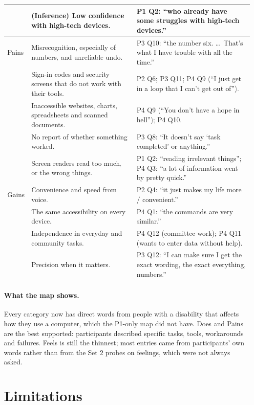 \documentclass[12pt, titlepage]{article}
\begin{document}
{\begin{longtable}{>{\raggedright\arraybackslash}p{1.8cm} >{\raggedright\arraybackslash}p{5.7cm} >{\raggedright\arraybackslash}p{7.6cm}}
 & \textbf{(Inference)} Low confidence with high-tech devices. & P1 Q2: ``who already have some struggles with high-tech devices.''\\
\midrule
Pains & Misrecognition, especially of numbers, and unreliable undo. & P3 Q10: ``the number six. \ldots\ That's what I have trouble with all the time.''\\\addlinespace[3pt]
 & Sign-in codes and security screens that do not work with their tools. & P2 Q6; P3 Q11; P4 Q9 (``I just get in a loop that I can't get out of'').\\\addlinespace[3pt]
 & Inaccessible websites, charts, spreadsheets and scanned documents. & P4 Q9 (``You don't have a hope in hell''); P4 Q10.\\\addlinespace[3pt]
 & No report of whether something worked. & P3 Q8: ``It doesn't say `task completed' or anything.''\\\addlinespace[3pt]
 & Screen readers read too much, or the wrong things. & P1 Q2: ``reading irrelevant things''; P4 Q3: ``a lot of information went by pretty quick.''\\
\midrule
Gains & Convenience and speed from voice. & P2 Q4: ``it just makes my life more / convenient.''\\\addlinespace[3pt]
 & The same accessibility on every device. & P4 Q1: ``the commands are very similar.''\\\addlinespace[3pt]
 & Independence in everyday and community tasks. & P4 Q12 (committee work); P4 Q11 (wants to enter data without help).\\\addlinespace[3pt]
 & Precision when it matters. & P3 Q12: ``I can make sure I get the exact wording, the exact everything, numbers.''\\
\end{longtable}
}

\paragraph{What the map shows.} Every category now has direct words from people with a disability that affects how they use a computer, which the P1-only map did not have. Does and Pains are the best supported: participants described specific tasks, tools, workarounds and failures. Feels is still the thinnest; most entries came from participants' own words rather than from the Set 2 probes on feelings, which were not always asked.

\section{Limitations}\label{sec:limits}
\end{document}
